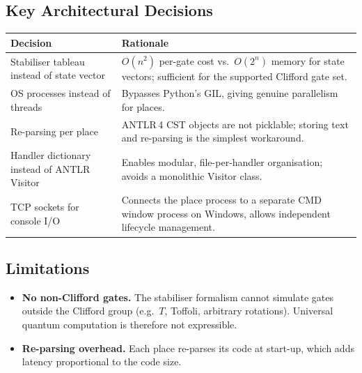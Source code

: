 \subsection{Key Architectural Decisions}
\label{sec:impl-decisions}

\begin{center}
\begin{tabular}{|p{4.5cm}|p{8.5cm}|}
\hline
\textbf{Decision} & \textbf{Rationale} \\
\hline
Stabiliser tableau instead of state vector &
    $O(n^2)$ per-gate cost vs.\ $O(2^n)$ memory for state vectors;
    sufficient for the supported Clifford gate set. \\
\hline
OS processes instead of threads &
    Bypasses Python's GIL, giving genuine parallelism for places. \\
\hline
Re-parsing per place &
    ANTLR\,4 CST objects are not picklable; storing text and re-parsing
    is the simplest workaround. \\
\hline
Handler dictionary instead of ANTLR Visitor &
    Enables modular, file-per-handler organisation; avoids a monolithic
    Visitor class. \\
\hline
TCP sockets for console I/O &
    Connects the place process to a separate CMD window process on
    Windows, allows independent lifecycle management. \\
\hline
\end{tabular}
\end{center}

\subsection{Limitations}
\label{sec:impl-limitations}

\begin{itemize}
    \item \textbf{No non-Clifford gates.}  The stabiliser formalism cannot
          simulate gates outside the Clifford group (e.g.\ $T$, Toffoli,
          arbitrary rotations).  Universal quantum computation is therefore
          not expressible.
    \item \textbf{Re-parsing overhead.}  Each place re-parses its code at
          start-up, which adds latency proportional to the code size.
\end{itemize}
